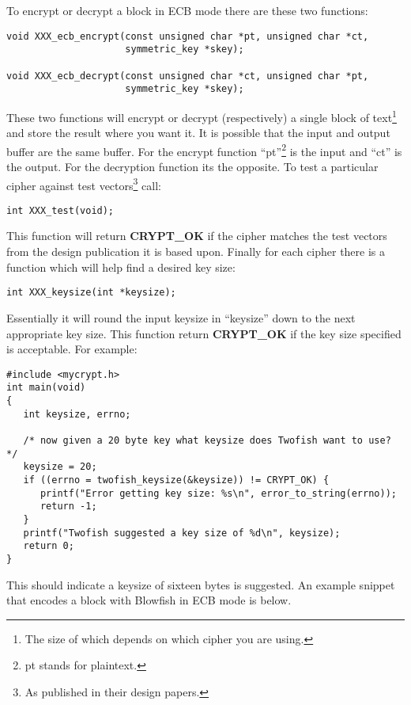 \documentclass{book}
\begin{document}
To encrypt or decrypt a block in ECB mode there are these two functions:
 
\begin{verbatim}
void XXX_ecb_encrypt(const unsigned char *pt, unsigned char *ct,
                     symmetric_key *skey);

void XXX_ecb_decrypt(const unsigned char *ct, unsigned char *pt,
                     symmetric_key *skey);
\end{verbatim}
These two functions will encrypt or decrypt (respectively) a single block of text\footnote{The size of which depends on
which cipher you are using.} and store the result where you want it.  It is possible that the input and output buffer are 
the same buffer.  For the encrypt function ``pt''\footnote{pt stands for plaintext.} is the input and ``ct'' is the output.
For the decryption function its the opposite.  To test a particular cipher against test vectors\footnote{As published in their design papers.} call: 
\begin{verbatim}
int XXX_test(void);
\end{verbatim}
This function will return {\bf CRYPT\_OK} if the cipher matches the test vectors from the design publication it is 
based upon.  Finally for each cipher there is a function which will help find a desired key size:
\begin{verbatim}
int XXX_keysize(int *keysize);
\end{verbatim}
Essentially it will round the input keysize in ``keysize'' down to the next appropriate key size.  This function
return {\bf CRYPT\_OK} if the key size specified is acceptable.  For example:
\begin{small}
\begin{verbatim}
#include <mycrypt.h>
int main(void)
{
   int keysize, errno;

   /* now given a 20 byte key what keysize does Twofish want to use? */
   keysize = 20;
   if ((errno = twofish_keysize(&keysize)) != CRYPT_OK) {
      printf("Error getting key size: %s\n", error_to_string(errno));
      return -1;
   }
   printf("Twofish suggested a key size of %d\n", keysize);
   return 0;
}
\end{verbatim}
\end{small}
This should indicate a keysize of sixteen bytes is suggested.  An example snippet that encodes a block with 
Blowfish in ECB mode is below.
\end{document}
